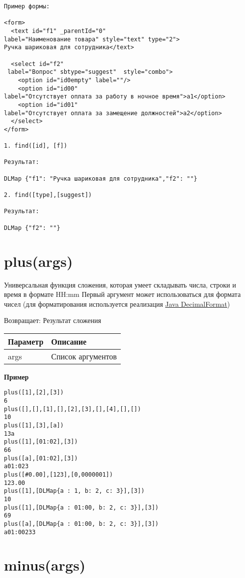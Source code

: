 \begin{verbatim}
Пример формы:

<form>
  <text id="f1" _parentId="0" 
label="Наименование товара" style="text" type="2">
Ручка шариковая для сотрудника</text>

  <select id="f2"
 label="Вопрос" sbtype="suggest"  style="combo">
    <option id="id0empty" label=""/>
    <option id="id00" 
label="Отсутствует оплата за работу в ночное время">a1</option>
    <option id="id01" 
label="Отсутствует оплата за замещение должностей">a2</option>
  </select>
</form>

1. find([id], [f])

Результат:

DLMap {"f1": "Ручка шариковая для сотрудника","f2": ""}

2. find([type],[suggest])

Результат:

DLMap {"f2": ""}
\end{verbatim}

\hypertarget{plusargs}{%
\section{plus(args)}\label{plusargs}}

Универсальная функция сложения, которая умеет складывать числа, строки и
время в формате HH:mm Первый аргумент может использоваться
для формата чисел (для форматирования используется реализация
\href{https://docs.oracle.com/javase/7/docs/api/java/text/DecimalFormat.html}{Java
DecimalFormat})

Возвращает: Результат сложения

\begin{longtable}[]{@{}ll@{}}
\toprule
Параметр & Описание\tabularnewline
\midrule
\endhead
args & Список аргументов\tabularnewline
\bottomrule
\end{longtable}

\textbf{Пример}

\begin{verbatim}
plus([1],[2],[3])
6
plus([],[],[1],[],[2],[3],[],[4],[],[])
10
plus([1],[3],[a])
13a
plus([1],[01:02],[3])
66
plus([a],[01:02],[3])
a01:023
plus([#0.00],[123],[0,0000001])
123.00
plus([1],[DLMap{a : 1, b: 2, c: 3}],[3])
10
plus([1],[DLMap{a : 01:00, b: 2, c: 3}],[3])
69
plus([a],[DLMap{a : 01:00, b: 2, c: 3}],[3])
a01:00233
\end{verbatim}

\hypertarget{minusargs}{%
\section{minus(args)}\label{minusargs}}

